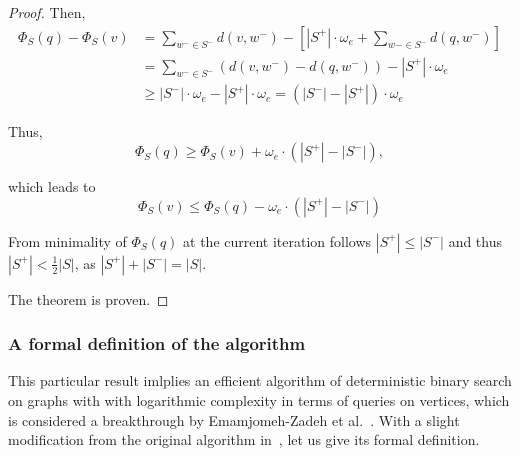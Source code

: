 \begin{proof}
	Then,
	\begin{align*}
	\Phi_S(q) - \Phi_S(v) &= \sum \limits_{w^- \in S^-} d(v, w^-) - \left[|S^+| \cdot \omega_e + \sum \limits_{w- \in S^-} d(q, w^-)\right] \\
	                      &= \sum \limits_{w^- \in S^-} \left(d(v, w^-) - d(q, w^-)\right) - |S^+| \cdot \omega_e \\
	                      &\ge |S^-| \cdot \omega_e - |S^+| \cdot \omega_e = \left(|S^-| - |S^+|\right) \cdot \omega_e
	\end{align*}


	Thus,
	\begin{equation*}
		\Phi_S(q) \ge \Phi_S(v) + \omega_e \cdot \left(|S^+| - |S^-|\right),
	\end{equation*}
	

	which leads to
	\begin{equation*}
		\Phi_S(v) \le \Phi_S(q) - \omega_e \cdot \left(|S^+| - |S^-|\right)
	\end{equation*}


	From minimality of $\Phi_S(q)$ at the current iteration follows $|S^+| \le |S^-|$ and thus $|S^+| < \frac{1}{2}|S|$, as $|S^+| + |S^-| = |S|$.


	The theorem is proven.
\end{proof}


\subsubsection*{A formal definition of the algorithm}
This particular result imlplies an efficient algorithm of deterministic binary search on graphs with with logarithmic complexity in terms of queries on vertices, which is considered a breakthrough by Emamjomeh-Zadeh et al.~\cite{main}. With a slight modification from the original algorithm in~\cite{main}, let us give its formal definition.

